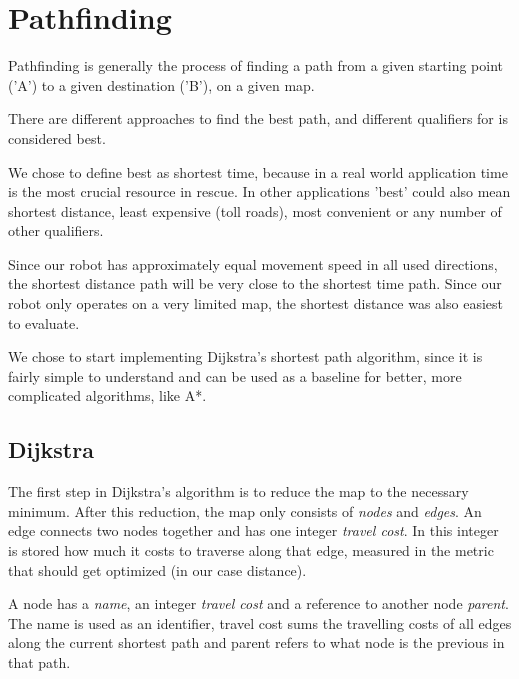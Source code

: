 \chapter{Pathfinding}\label{ch:path}
Pathfinding is generally the process of finding a path from a given starting point ('A')
to a given destination ('B'),
on a given map.

There are different approaches to find the best path,
and different qualifiers for is considered best.

We chose to define best as shortest time,
because in a real world application time is the most crucial resource in rescue.
In other applications 'best' could also mean shortest distance, least expensive (toll roads),
most convenient or any number of other qualifiers.

Since our robot has approximately equal movement speed in all used directions,
the shortest distance path will be very close to the shortest time path.
Since our robot only operates on a very limited map,
the shortest distance was also easiest to evaluate.

We chose to start implementing Dijkstra's shortest path algorithm,
since it is fairly simple to understand
and can be used as a baseline for better, more complicated algorithms,
like A*.

\section{Dijkstra}
The first step in Dijkstra's algorithm is to reduce the map to the necessary minimum.
After this reduction, the map only consists of \emph{nodes} and \emph{edges}.
An edge connects two nodes together and has one integer \emph{travel cost}.
In this integer is stored how much it costs to traverse along that edge,
measured in the metric that should get optimized (in our case distance).

A node has a \emph{name}, an integer \emph{travel cost} and a reference to another node \emph{parent}.
The name is used as an identifier,
travel cost sums the travelling costs of all edges along the current shortest path
and parent refers to what node is the previous in that path.

\cite{Pound2017}

